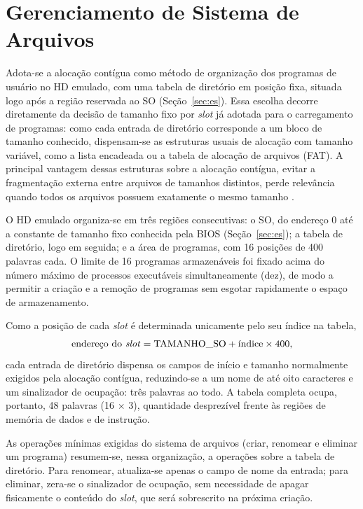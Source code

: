 \documentclass[
	12pt,				%
	openright,			%
	a4paper,			%
	english,			%
	french,				%
	spanish,			%
	brazilian,				%
	]{abntex2}
\begin{document}
\section{Gerenciamento de Sistema de Arquivos}
\label{sec:arquivos}

Adota-se a alocação contígua como método de organização dos programas de usuário
no HD emulado, com uma tabela de diretório em posição fixa, situada logo após a
região reservada ao SO (Seção~\ref{sec:es}). Essa escolha decorre diretamente da
decisão de tamanho fixo por \emph{slot} já adotada para o carregamento de
programas: como cada entrada de diretório corresponde a um bloco de tamanho
conhecido, dispensam-se as estruturas usuais de alocação com tamanho variável,
como a lista encadeada ou a tabela de alocação de arquivos (FAT). A principal
vantagem dessas estruturas sobre a alocação contígua, evitar a fragmentação
externa entre arquivos de tamanhos distintos, perde relevância quando todos os
arquivos possuem exatamente o mesmo tamanho \cite{silberschatz2015}.

O HD emulado organiza-se em três regiões consecutivas: o SO, do endereço 0 até a
constante de tamanho fixo conhecida pela BIOS (Seção~\ref{sec:es}); a tabela de
diretório, logo em seguida; e a área de programas, com 16 posições de 400
palavras cada. O limite de 16 programas armazenáveis foi fixado acima do número máximo de
processos executáveis simultaneamente (dez), de modo a permitir
a criação e a remoção de programas sem esgotar rapidamente o espaço de
armazenamento.

Como a posição de cada \emph{slot} é determinada unicamente pelo seu índice na
tabela,
\begin{equation}
  \text{endereço do \emph{slot}} = \text{TAMANHO\_SO} + \text{índice} \times 400,
\end{equation}
cada entrada de diretório dispensa os campos de início e tamanho normalmente
exigidos pela alocação contígua, reduzindo-se a um nome de até oito caracteres e
um sinalizador de ocupação: três palavras ao todo. A tabela completa ocupa,
portanto, 48 palavras (16 $\times$ 3), quantidade desprezível frente às regiões
de memória de dados e de instrução.

As operações mínimas exigidas do sistema de arquivos (criar, renomear e
eliminar um programa) resumem-se, nessa organização, a operações sobre a
tabela de diretório. Para renomear, atualiza-se apenas o campo de nome da
entrada; para eliminar, zera-se o sinalizador de ocupação, sem necessidade de
apagar fisicamente o conteúdo do \emph{slot}, que será sobrescrito na próxima
criação.
\end{document}
